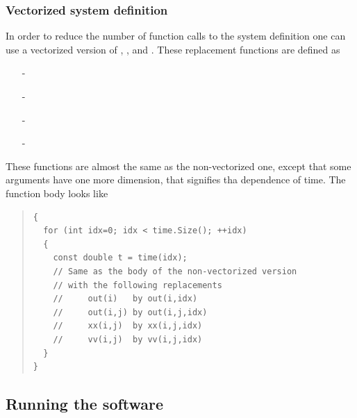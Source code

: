 \documentclass[10pt,a4paper]{ddedoc}
\begin{document}
\subsubsection{Vectorized system definition}\label{vecsysdef}

In order to reduce the number of function calls to the system definition one can 
use a vectorized version of , ,  and . These replacement functions are defined as
\begin{itemize}
  \item[-] 
  \item[-] 
  \item[-] 
  \item[-] 
\end{itemize}
These functions are almost the same as the non-vectorized one, except that some arguments have one more dimension, that signifies tha dependence of time. The function body looks like
{ \small \begin{quote} \begin{lstlisting}[frame=single]
{
  for (int idx=0; idx < time.Size(); ++idx)
  {
    const double t = time(idx);
    // Same as the body of the non-vectorized version
    // with the following replacements
    //     out(i)   by out(i,idx)
    //     out(i,j) by out(i,j,idx)
    //     xx(i,j)  by xx(i,j,idx)
    //     vv(i,j)  by vv(i,j,idx)
  }
}
\end{lstlisting} \end{quote} } \noindent

\subsection{Running the software}
\end{document}
